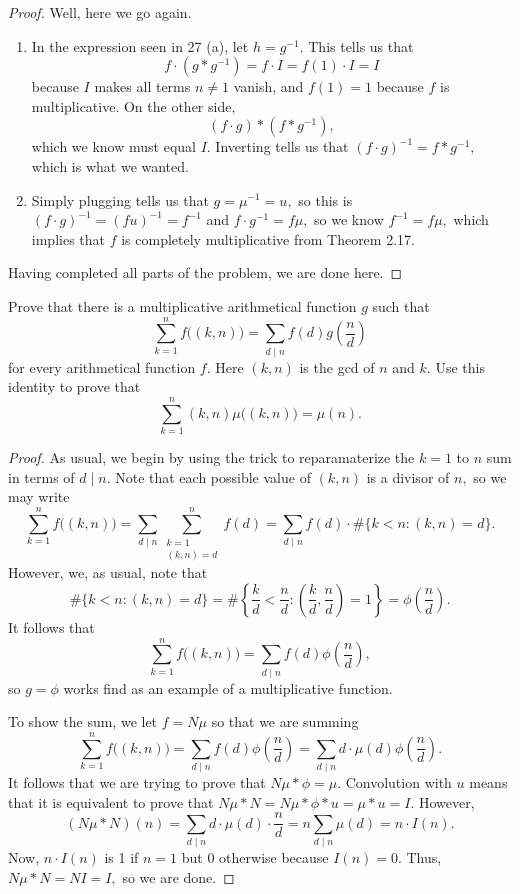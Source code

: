 \begin{proof}
Well, here we go again.
\begin{enumerate}[label=(\alph*)]
    \item In the expression seen in 27 (a), let $h=g^{-1}.$ This tells us that
    \[f\cdot\left(g*g^{-1}\right)=f\cdot I=f(1)\cdot I=I\]
    because $I$ makes all terms $n\ne1$ vanish, and $f(1)=1$ because $f$ is multiplicative. On the other side,
    \[(f\cdot g)*\left(f*g^{-1}\right),\]
    which we know must equal $I.$ Inverting tells us that $(f\cdot g)^{-1}=f*g^{-1},$ which is what we wanted.
    \item Simply plugging tells us that $g=\mu^{-1}=u,$ so this is $(f\cdot g)^{-1}=(fu)^{-1}=f^{-1}$ and $f\cdot g^{-1}=f\mu,$ so we know $f^{-1}=f\mu,$ which implies that $f$ is completely multiplicative from Theorem 2.17.
\end{enumerate}
Having completed all parts of the problem, we are done here.
\end{proof}

\begin{exercise}
Prove that there is a multiplicative arithmetical function $g$ such that
\[\sum_{k=1}^nf\big((k,n)\big)=\sum_{d\mid n}f(d)g\left(\frac nd\right)\]
for every arithmetical function $f.$ Here $(k,n)$ is the gcd of $n$ and $k.$ Use this identity to prove that
\[\sum_{k=1}^n(k,n)\mu\big((k,n)\big)=\mu(n).\]
\end{exercise}

\begin{proof}
As usual, we begin by using the trick to reparamaterize the $k=1$ to $n$ sum in terms of $d\mid n.$ Note that each possible value of $(k,n)$ is a divisor of $n,$ so we may write
\[\sum_{k=1}^nf\big((k,n)\big)=\sum_{d\mid n}\sum_{\substack{k=1\\(k,n)=d}}^nf(d)=\sum_{d\mid n}f(d)\cdot\#\{k<n:(k,n)=d\}.\]
However, we, as usual, note that
\[\#\{k<n:(k,n)=d\}=\#\left\{\frac kd<\frac nd:\left(\frac kd,\frac nd\right)=1\right\}=\phi\left(\frac nd\right).\]
It follows that
\[\sum_{k=1}^nf\big((k,n)\big)=\sum_{d\mid n}f(d)\phi\left(\frac nd\right),\]
so $g=\phi$ works find as an example of a multiplicative function.

To show the sum, we let $f=N\mu$ so that we are summing
\[\sum_{k=1}^nf\big((k,n)\big)=\sum_{d\mid n}f(d)\phi\left(\frac nd\right)=\sum_{d\mid n}d\cdot \mu(d)\phi\left(\frac nd\right).\]
It follows that we are trying to prove that $N\mu*\phi=\mu.$ Convolution with $u$ means that it is equivalent to prove that $N\mu*N=N\mu*\phi*u=\mu*u=I.$ However,
\[(N\mu*N)(n)=\sum_{d\mid n}d\cdot\mu(d)\cdot\frac nd=n\sum_{d\mid n}\mu(d)=n\cdot I(n).\]
Now, $n\cdot I(n)$ is 1 if $n=1$ but 0 otherwise because $I(n)=0.$ Thus, $N\mu*N=NI=I,$ so we are done.
\end{proof}

